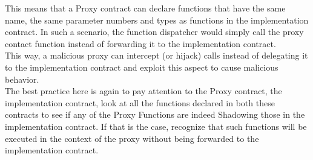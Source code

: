 This means that a Proxy contract can declare functions that have the same name, the same parameter numbers and types as functions in the implementation contract. In such a scenario, the function dispatcher would simply call the proxy contact function instead of forwarding it to the implementation contract. \\

This way, a malicious proxy can intercept (or hijack) calls instead of delegating it to the implementation contract and exploit this aspect to cause malicious behavior. \\

The best practice here is again to pay attention to the Proxy contract, the implementation contract, look at all the functions declared in both these contracts to see if any of the Proxy Functions are indeed Shadowing those in the implementation contract. If that is the case, recognize that such functions will be executed in the context of the proxy without being forwarded to the implementation contract.
